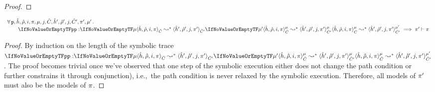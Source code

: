 \begin{proof}
\end{proof}

\begin{lemma}\label{lemma:pc:monotonocity}
$$
\begin{array}{l}
\forall \, \prog, \sheap, \sstore,  i, \pc, \mode, j, \sctx, \sheap', \sstore', j, \sctx', \pc', \mode' \, . \,  \\ 
\qquad \symbtranstrans[\prog][\mode][\mode']{\sheap, \sstore, i, \pc}{\sheap', \sstore', j, \pc'}[\sctx][\sctx']  
   \implies \pc' \vdash \pc
\end{array}
$$
\end{lemma}
\begin{proof}
By induction on the length of the symbolic trace $\symbtranstrans[\prog][\mode][\mode']{\sheap, \sstore, i, \pc}{\sheap', \sstore', j, \pc'}[\sctx][\sctx']$.
The proof becomes trivial once we've observed that one step of the symbolic execution either does not change the path condition or further constrains it through conjunction), i.e.,~the path condition is never relaxed by the symbolic execution. Therefore, all models of $\pi'$ must also be the models of $\pi$.
\end{proof}


